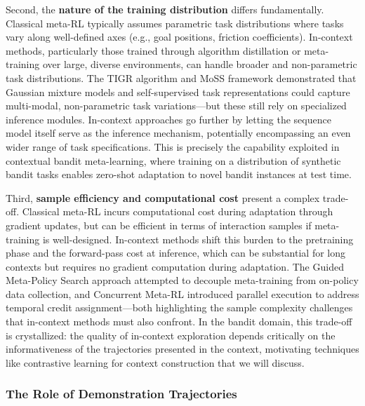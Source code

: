 \documentclass[11pt]{article}
\begin{document}
Second, the \textbf{nature of the training distribution} differs fundamentally. Classical meta-RL typically assumes parametric task distributions where tasks vary along well-defined axes (e.g., goal positions, friction coefficients). In-context methods, particularly those trained through algorithm distillation or meta-training over large, diverse environments, can handle broader and non-parametric task distributions. The TIGR algorithm \cite{ref314} and MoSS framework \cite{ref311} demonstrated that Gaussian mixture models and self-supervised task representations could capture multi-modal, non-parametric task variations---but these still rely on specialized inference modules. In-context approaches go further by letting the sequence model itself serve as the inference mechanism, potentially encompassing an even wider range of task specifications. This is precisely the capability exploited in contextual bandit meta-learning, where training on a distribution of synthetic bandit tasks enables zero-shot adaptation to novel bandit instances at test time.

Third, \textbf{sample efficiency and computational cost} present a complex trade-off. Classical meta-RL incurs computational cost during adaptation through gradient updates, but can be efficient in terms of interaction samples if meta-training is well-designed. In-context methods shift this burden to the pretraining phase and the forward-pass cost at inference, which can be substantial for long contexts but requires no gradient computation during adaptation. The Guided Meta-Policy Search approach \cite{ref315} attempted to decouple meta-training from on-policy data collection, and Concurrent Meta-RL \cite{ref316} introduced parallel execution to address temporal credit assignment---both highlighting the sample complexity challenges that in-context methods must also confront. In the bandit domain, this trade-off is crystallized: the quality of in-context exploration depends critically on the informativeness of the trajectories presented in the context, motivating techniques like contrastive learning for context construction that we will discuss.

\subsubsection{The Role of Demonstration Trajectories}
\end{document}
